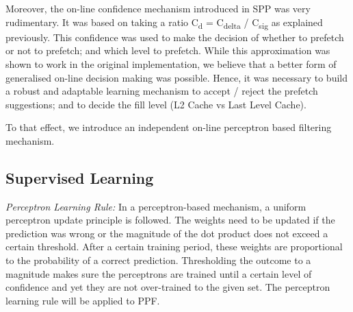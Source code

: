 Moreover, the on-line confidence mechanism introduced in SPP was very
rudimentary.  It was based on taking a ratio C\textsubscript{d} =
C\textsubscript{delta} / C\textsubscript{sig} as explained previously. This
confidence was used to make the decision of whether to prefetch or not to
prefetch; and which level to prefetch.  While this approximation was shown to
work in the original implementation, we believe that a better form of
generalised on-line decision making was possible.  Hence, it was necessary to
build a robust and adaptable learning mechanism to accept / reject the
prefetch suggestions; and to decide the fill level (L2 Cache vs Last Level
Cache).

To that effect, we introduce an independent on-line perceptron based
filtering mechanism.

\subsection{Supervised Learning}

\textit{Perceptron Learning Rule:} In a perceptron-based mechanism, a uniform
perceptron update principle is followed.  The weights need to be updated if
the prediction was wrong or the magnitude of the dot product does not exceed
a certain threshold.  After a certain training period, these weights are
proportional to the probability of a correct prediction.  Thresholding the outcome to a
 magnitude makes sure the perceptrons are trained until a certain level of
confidence and yet they are not over-trained to the given set.  The perceptron 
learning rule will be applied to PPF.
